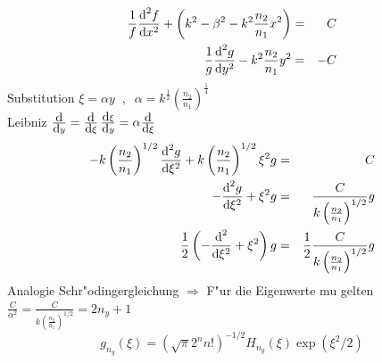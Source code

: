 \documentclass[11pt,twoside]{report}
\begin{document}
\begin{eqnarray*}
  \frac{1}{f}{\mbox{d}^2 f\over \mbox{d} x^2} + \left( k^2 - \beta^2 - k^2\frac{n_2}{n_1} x^2 \right) & = & C \\
  \frac{1}{g}{\mbox{d}^2 g\over \mbox{d} y^2} - k^2 \frac{n_2}{n_1}y^2 & = & -C \\
\end{eqnarray*}
Substitution $\xi = \alpha y \;\; , \;\; \alpha = k^{\frac{1}{2}}\left( \frac{n_2}{n_1} \right) ^{\frac{1}{4}} $ \\
Leibniz ${\mbox{d} \over \mbox{d} y} = {\mbox{d} \over \mbox{d} \xi} \, {\mbox{d} \xi \over \mbox{d} y} = \alpha {\mbox{d}\over \mbox{d}\xi} $
\begin{eqnarray*}
  -k\left( \frac{n_2}{n_1} \right)^{1/2} {\mbox{d}^2 g\over \mbox{d} \xi^2} + k\left( \frac{n_2}{n_1} \right)^{1/2} \xi^2 g & = & C \\
  -{\mbox{d}^2 g \over \mbox{d} \xi^2} + \xi^2 g & = & \frac{C}{k \left( \frac{n_2}{n_1} \right) ^{1/2}} g \\
  \frac{1}{2} \left( -{\mbox{d}^2 \over \mbox{d} \xi^2} + \xi^2 \right) g & = & \frac{1}{2} \frac{C}{k\left( \frac{n_2}{n_1} \right)^{1/2} }g
\end{eqnarray*}
Analogie Schr"odingergleichung $\Longrightarrow$ F"ur die Eigenwerte mu\3 gelten $\frac{C}{\alpha^2} = \frac{C} {k\left( \frac{n_2}{n_1}\right)^{1/2}} = 2n_y + 1$ 
$$ g_{n_y}\left( \xi \right) = \left( \sqrt{\pi} 2^n n! \right)^{-1/2} H_{n_y}\left( \xi \right) \exp \left( \xi^2 / 2 \right) $$
\end{document}
